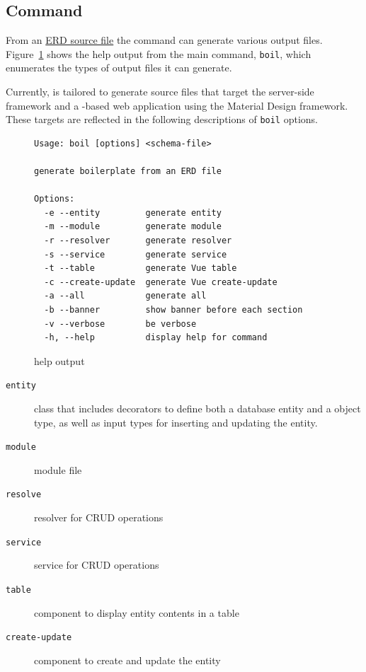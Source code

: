\documentclass{article}
\newcommand{\boilcmd}{\texttt{boil}}
\begin{document}
\subsection{Command}
\label{sec:command}


From an \hyperref[src:erd-source-file]{ERD source file}
the \boil{} command can generate various output files.
Figure~\ref{fig:help} shows the help output
from the main \boil{} command, \boilcmd,
which enumerates the types of output files it can generate.

Currently,
\boil{} is tailored to generate source files
that target
the \nest{} server-side framework
and a \vue-based web application using the \vuetify{} Material Design framework.
These targets are reflected in the following descriptions
of \boilcmd{} options.

\begin{figure}[hbt]
  \centering
\begin{Verbatim}[frame=single,framerule=1pt,rulecolor=blue!50!white]
Usage: boil [options] <schema-file>

generate boilerplate from an ERD file

Options:
  -e --entity         generate entity
  -m --module         generate module
  -r --resolver       generate resolver
  -s --service        generate service
  -t --table          generate Vue table
  -c --create-update  generate Vue create-update
  -a --all            generate all
  -b --banner         show banner before each section
  -v --verbose        be verbose
  -h, --help          display help for command
\end{Verbatim}
  \caption{\boil{} help output}
  \label{fig:help}
\end{figure}

\begin{description}
\item[\texttt{entity}]
  \ts{} class
  that includes decorators
  to define both a \typeorm{} database entity
  and a \gql{} object type,
  as well as \gql{} input types
  for inserting and updating the entity.
\item[\texttt{module}]
  \nest{} module file
\item[\texttt{resolve}]
  \gql{} resolver for CRUD operations
\item[\texttt{service}]
  \typeorm{} service for CRUD operations
\item[\texttt{table}]
  \vue{} component to display entity contents in a \vuetify{} table
\item[\texttt{create-update}]
  \vue{} component to create and update the entity
\end{description}
\end{document}

